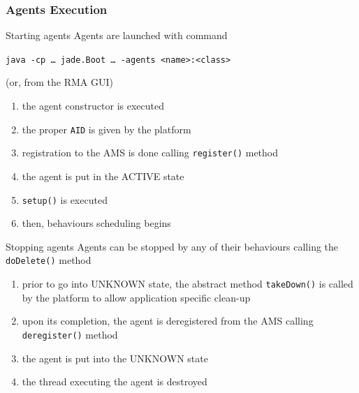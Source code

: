 \documentclass{beamer}\mode<presentation>{\usetheme{AMSCesenaPurpleAndGold}}
\begin{document}
\begin{frame}[c,allowframebreaks]\frametitle{Agents Execution}
    \begin{block}{Starting agents}
        Agents are launched with command
        \begin{center}
            \texttt{java -cp \ldots{} jade.Boot \ldots{} -agents <name>:<class>}
        \end{center}
        (or, from the RMA GUI)
        \begin{enumerate}
            \item the agent constructor is executed
            \item the proper \texttt{AID} is given by the platform
            \item registration to the AMS is done calling \texttt{register()} method
            \item the agent is put in the ACTIVE state
            \item \texttt{setup()} is executed
            \item then, behaviours \alert{scheduling} begins
        \end{enumerate}
    \end{block}
    \begin{block}{Stopping agents}
        Agents can be stopped by any of their behaviours calling the \texttt{doDelete()} method
        \begin{enumerate}
            \item prior to go into UNKNOWN state, the abstract method \texttt{takeDown()} is called by the platform to allow application specific clean-up
            \item upon its completion, the agent is deregistered from the AMS calling \texttt{deregister()} method
            \item the agent is put into the UNKNOWN state
            \item the thread executing the agent is destroyed
        \end{enumerate}
    \end{block}
\end{frame}
\end{document}
